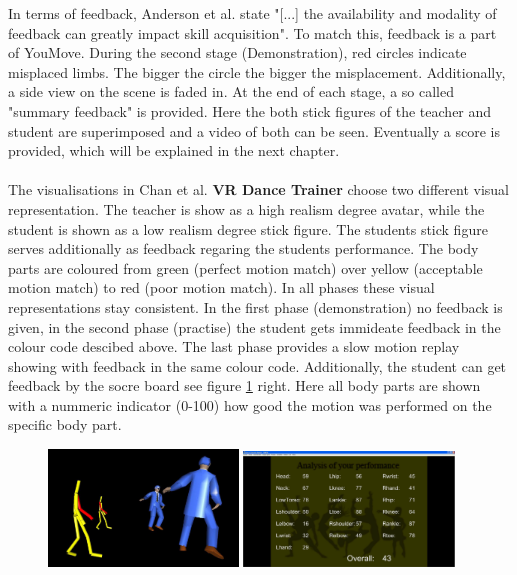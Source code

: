 In terms of feedback, Anderson et al. state "[...] the availability and modality of feedback can greatly impact skill acquisition". To match this, feedback is a part of YouMove. During the second stage (Demonstration), red circles indicate misplaced limbs. The bigger the circle the bigger the misplacement. Additionally, a side view on the scene is faded in. At the end of each stage, a so called "summary feedback" is provided. Here the both stick figures of the teacher and student are superimposed and a video of both can be seen. Eventually a score is provided, which will be explained in the next chapter.\\ \\
The visualisations in Chan et al. \textbf{VR Dance Trainer} choose two different visual representation. The teacher is show as a high realism degree avatar, while the student is shown as a low realism degree stick figure. The students stick figure serves additionally as feedback regaring the students performance. The body parts are coloured from green (perfect motion match) over yellow (acceptable motion match) to red (poor motion match). In all phases these visual representations stay consistent. In the first phase (demonstration) no feedback is given, in the second phase (practise) the student gets immideate feedback in the colour code descibed above. The last phase provides a slow motion replay showing with feedback in the same colour code. Additionally, the student can get feedback by the socre board see figure \ref{fig:vrdt} right. Here all body parts are shown with a nummeric indicator (0-100) how good the motion was performed on the specific body part.
\begin{figure}
	\centering
	\includegraphics[width=0.45\textwidth]{img/VRDanceTrainerPractice.png}
	\includegraphics[width=0.5\textwidth]{img/VRDanceTrainerScoreBoard.png}
	\caption{\todo \cite{Chan2011a}}
	\label{fig:vrdt}
\end{figure}
